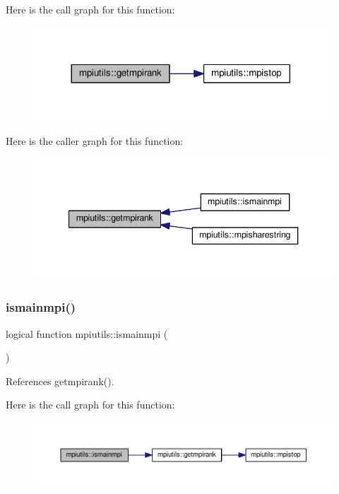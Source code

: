 Here is the call graph for this function\+:
\nopagebreak
\begin{figure}[H]
\begin{center}
\leavevmode
\includegraphics[width=312pt]{namespacempiutils_a10119a7c6a3093e9f38566d063e88364_cgraph}
\end{center}
\end{figure}
Here is the caller graph for this function\+:
\nopagebreak
\begin{figure}[H]
\begin{center}
\leavevmode
\includegraphics[width=340pt]{namespacempiutils_a10119a7c6a3093e9f38566d063e88364_icgraph}
\end{center}
\end{figure}
\mbox{\label{namespacempiutils_a8c41001658ce5aafd28c17c28e215bf6}} 
\subsubsection{\texorpdfstring{ismainmpi()}{ismainmpi()}}
{\footnotesize\ttfamily logical function mpiutils\+::ismainmpi (\begin{DoxyParamCaption}{ }\end{DoxyParamCaption})}



References getmpirank().

Here is the call graph for this function\+:
\nopagebreak
\begin{figure}[H]
\begin{center}
\leavevmode
\includegraphics[width=350pt]{namespacempiutils_a8c41001658ce5aafd28c17c28e215bf6_cgraph}
\end{center}
\end{figure}
\mbox{\label{namespacempiutils_a81a7de07e984011ee5f1d69d403e6006}} 
